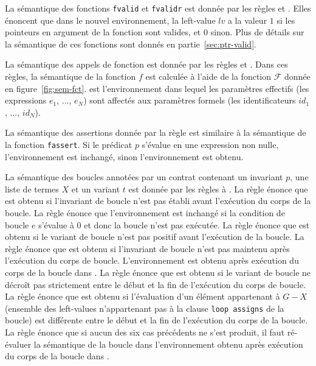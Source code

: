 La sémantique des fonctions \lstinline'fvalid' et \lstinline'fvalidr' est donnée
par les règles  et .
Elles énoncent que dans le nouvel environnement, la left-value $\mathit{lv}$ a
la valeur $1$ si les pointeurs en argument de la fonction sont valides, et $0$
sinon.
Plus de détails sur la sémantique de ces fonctions sont donnés en
partie~\ref{sec:ptr-valid}.

La sémantique des appels de fonction est donnée par les règles 
et .
Dans ces règles, la sémantique de la fonction $f$ est calculée à
l'aide de la fonction $\mathcal{F}$ donnée en figure~\ref{fig:sem-fct}.
 est l'environnement
dans lequel les paramètres effectifs (les expressions $e_1$, ..., $e_N$) sont
affectés aux paramètres formels (les identificateurs
$\mathit{id_1}$, ..., $\mathit{id_N}$).

La sémantique des assertions \eacsl donnée par la règle  est
similaire à la sémantique de la fonction \lstinline'fassert'.
Si le prédicat $p$ s'évalue en une expression non nulle,
l'environnement \env{} est inchangé, sinon l'environnement \errorenv est obtenu.

La sémantique des boucles annotées par un contrat contenant un invariant
$p$, une liste de termes $X$ et un variant $t$ est
donnée par les règles  à .
La règle  énonce que \errorenv est obtenu si l'invariant de
boucle n'est pas établi avant l'exécution du corps de la boucle.
La règle  énonce que l'environnement \env{} est inchangé si
la condition de boucle $e$ s'évalue à $0$ et donc la boucle n'est pas
exécutée.
La règle  énonce que \errorenv est obtenu si le variant de
boucle n'est pas positif avant l'exécution de la boucle.
La règle  énonce que \errorenv est obtenu si l'invariant de
boucle n'est pas maintenu après l'exécution du corps de boucle.
L'environnement  est obtenu après exécution du
corps de la boucle dans \env.
La règle  énonce que \errorenv est obtenu si le variant de
boucle ne décroît pas strictement entre le début et la fin de l'exécution du
corps de boucle.
La règle  énonce que \errorenv est obtenu si l'évaluation
d'un élément appartenant à $G-X$ (ensemble des left-values n'appartenant pas à
la clause \lstinline'loop assigns' de la boucle) est différente entre le début
et la fin de l'exécution du corps de la boucle.
La règle  énonce que si aucun des six cas précédents ne s'est
produit, il faut ré-évaluer la sémantique de la boucle dans l'environnement
obtenu après exécution du corps de la boucle dans \env.



